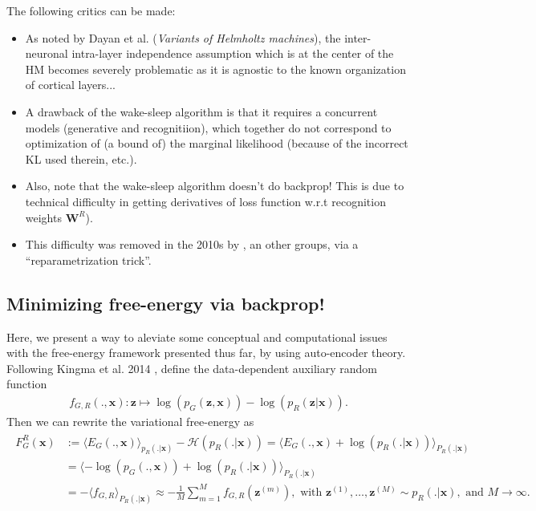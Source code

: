 \documentclass{article} %
\def\z{\mathbf{z}}
\def\W{\mathbf{W}}
\def\x{\mathbf{x}}
\begin{document}
The following critics can be made:
\begin{itemize}
  \item
    As noted by Dayan et al. (\textit{Variants of Helmholtz machines}), the inter-neuronal intra-layer independence assumption which is at the center of the HM becomes severely problematic as it is agnostic to the known organization of cortical layers...
  \item A drawback of the wake-sleep algorithm is that it requires a concurrent models (generative and recognitiion), which together do not correspond to optimization of (a bound of) the marginal likelihood (because of the incorrect KL used therein, etc.).
  \item Also, note that the wake-sleep algorithm doesn't do backprop! This is due to
    technical difficulty in getting derivatives of loss function w.r.t
    recognition weights $\W^R$).
  \item This difficulty was removed in the 2010s by \citep{kingma2013auto}, an other groups, via a ``reparametrization trick''.
    \end{itemize}


\subsection{Minimizing free-energy via backprop!}
\label{sec:vae}
Here, we present a way to aleviate some conceptual and computational issues with the
free-energy framework presented thus far, by using auto-encoder theory.
Following Kingma et al. 2014 \citep{kingma2013auto}, define the data-dependent auxiliary random
function
\begin{eqnarray}
  f_{G,R}(., \x) :\z \mapsto \log(p_G(\z,\x)) - \log(p_R(\z|\x)).
\end{eqnarray}
Then we can rewrite the
variational free-energy as
\begin{eqnarray*}
  \begin{split}
    F_G^R(\x) &:= \langle E_G(., \x) \rangle_{p_R(. |\x)} - \mathcal H(p_R(. |\x)) = \langle E_G(., \x) + \log(p_R(.|\x))\rangle_{P_R(.|\x)}\\
    &=\langle -\log(p_G(.,\x)) + \log(p_R(.|\x))\rangle_{P_R(.|\x)}\\
    &= -\langle f_{G,R}\rangle_{P_R(.|\x)} \approx -\frac{1}{M}\sum_{m=1}^Mf_{G,R}(\z^{(m)}), \text{ with }\z^{(1)},\ldots,\z^{(M)} \sim p_R(.|\x), \text{ and }M \rightarrow \infty.
    \end{split}
\end{eqnarray*}
\end{document}
